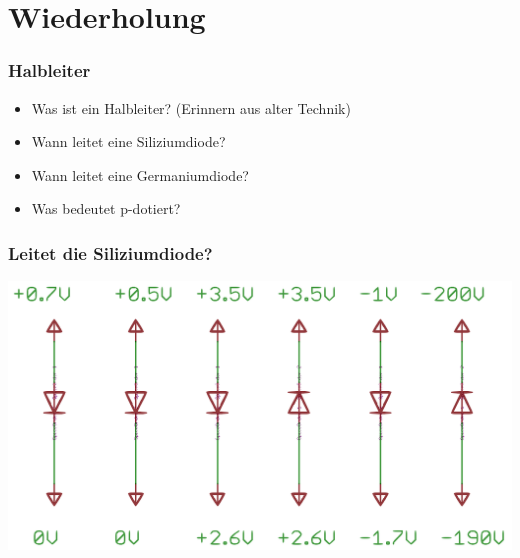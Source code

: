 

\subtitle{Technik A05: \\
           Die Diode und ihre Anwendungen \\[2em]}
\date{Stand 18.05.2016}



\section*{Wiederholung}

\begin{frame}
    \frametitle{Halbleiter}
      	\begin{itemize}
			\item Was ist ein Halbleiter? (Erinnern aus alter Technik)
			\item Wann leitet eine Siliziumdiode?
			\item Wann leitet eine Germaniumdiode?
			\item Was bedeutet p-dotiert?
    \end{itemize}
\end{frame}

\begin{frame}
    \frametitle{Leitet die Siliziumdiode?}
    \begin{center}
        \includegraphics[width=1\textwidth,height=.85\textheight,keepaspectratio]{a05/Leit_Diode.png}
	\end{center}
\end{frame}

